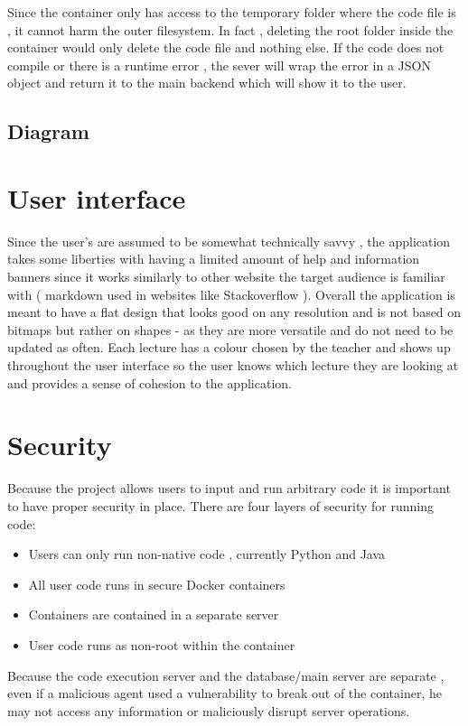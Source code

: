 Since the container only has access to the temporary folder where the code file is , it cannot harm the outer filesystem. In fact , deleting the root folder inside the container would only delete the code file and nothing else.
If the code does not compile or there is a runtime error , the sever will wrap the error in a JSON object and return it to the main backend which will show it to the user.

\subsection{Diagram}

\section{User interface}
Since the user's are assumed to be somewhat technically savvy , the application takes some liberties with having a limited amount of help and information banners since it works similarly to other website the target audience is familiar with ( markdown used in websites like Stackoverflow \cite{stackoverflow} ).
Overall the application is meant to have a flat design that looks good on any resolution and is not based on bitmaps but rather on shapes - as they are more versatile and do not need to be updated as often.
Each lecture has a colour chosen by the teacher and shows up throughout the user interface so the user knows which lecture they are looking at and provides a sense of cohesion to the application.


\section{Security}
Because the project allows users to input and run arbitrary code it is important to have proper security in place. There are four layers of security for running code:
\begin{itemize}
\item Users can only run non-native code , currently Python and Java
\item 	All user code runs in secure Docker containers
\item	Containers are contained in a separate server
\item User code runs as non-root within the container
\end{itemize}
Because the code execution server and the database/main server are separate , even if a malicious agent used a vulnerability to break out of the container, he may not access any information or maliciously disrupt server operations.

